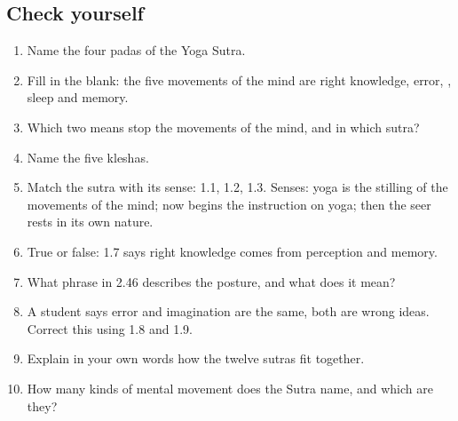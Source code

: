\subsection*{Check yourself}
\begin{enumerate}
\item Name the four padas of the Yoga Sutra.
\item Fill in the blank: the five movements of the mind are right knowledge, error, \underline{\hspace{2cm}}, sleep and memory.
\item Which two means stop the movements of the mind, and in which sutra?
\item Name the five kleshas.
\item Match the sutra with its sense: 1.1, 1.2, 1.3. Senses: yoga is the stilling of the movements of the mind; now begins the instruction on yoga; then the seer rests in its own nature.
\item True or false: 1.7 says right knowledge comes from perception and memory.
\item What phrase in 2.46 describes the posture, and what does it mean?
\item A student says error and imagination are the same, both are wrong ideas. Correct this using 1.8 and 1.9.
\item Explain in your own words how the twelve sutras fit together.
\item How many kinds of mental movement does the Sutra name, and which are they?
\end{enumerate}

